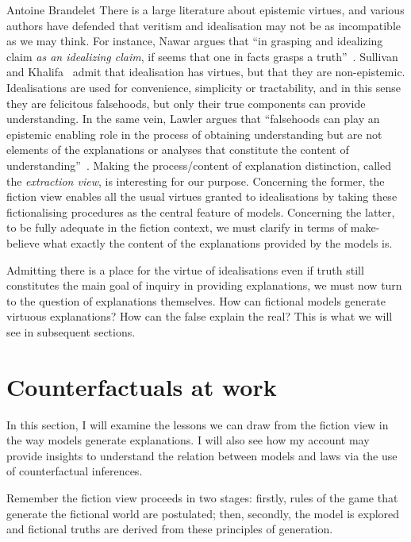 \begin{artengenv}{Antoine Brandelet}
There is a large literature about epistemic virtues, and various authors have defended that veritism and idealisation may not be as incompatible as we may think. For instance, Nawar argues that ``in grasping and idealizing claim \textit{as an idealizing claim}, if seems that one in facts grasps a truth''~\parencite[][his emphasis]{Nawar2019}. Sullivan and Khalifa~\parencite*{Sullivan2019} admit that idealisation has virtues, but that they are non-epistemic. Idealisations are used for convenience, simplicity or tractability, and in this sense they are felicitous falsehoods, but only their true components can provide understanding. In the same vein, Lawler argues that ``falsehoods can play an epistemic enabling role in the process of obtaining understanding but are not elements of the explanations or analyses that constitute the content of understanding''~\parencite{Lawler2019}. Making the process/content of explanation distinction, called the \textit{extraction view}, is interesting for our purpose. Concerning the former, the fiction view enables all the usual virtues granted to idealisations by taking these fictionalising procedures as the central feature of models. Concerning the latter, to be fully adequate in the fiction context, we must clarify in terms of make-believe what exactly the content of the explanations provided by the models is.

Admitting there is a place for the virtue of idealisations even if truth still constitutes the main goal of inquiry in providing explanations, we must now turn to the question of explanations themselves. How can fictional models generate virtuous explanations? How can the false explain the real? This is what we will see in subsequent sections.

\section{Counterfactuals at work}\label{sec:counterfactuals}


In this section, I will examine the lessons we can draw from the fiction view in the way models generate explanations. I will also see how my account may provide insights to understand the relation between models and laws via the use of counterfactual inferences.

Remember the fiction view proceeds in two stages: firstly, rules of the game that generate the fictional world are postulated; then, secondly, the model is explored and fictional truths are derived from these principles of generation.


\end{artengenv}
